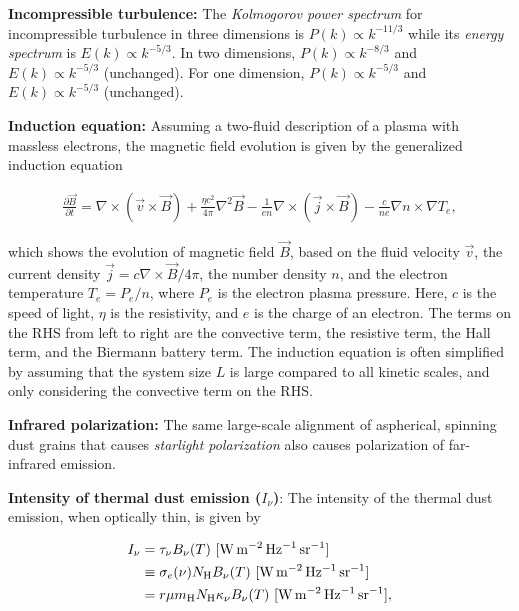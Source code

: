 \documentclass[a4paper,10pt]{article}
\begin{document}
{\noindent}\textbf{Incompressible turbulence:} The \textit{Kolmogorov power spectrum} for incompressible turbulence in three dimensions is $P(k)\propto k^{-11/3}$ while its \textit{energy spectrum} is $E(k)\propto k^{-5/3}$. In two dimensions, $P(k)\propto k^{-8/3}$ and $E(k)\propto k^{-5/3}$ (unchanged). For one dimension, $P(k)\propto k^{-5/3}$ and $E(k)\propto k^{-5/3}$ (unchanged).

{\noindent}\textbf{Induction equation:} Assuming a two-fluid description of a plasma with massless electrons, the magnetic field evolution is given by the generalized induction equation

\begin{align*}
    \frac{\partial\vec{B}}{\partial t} = \nabla\times(\vec{v}\times\vec{B}) + \frac{\eta c^2}{4\pi}\nabla^2\vec{B} - \frac{1}{en}\nabla\times(\vec{j}\times\vec{B}) - \frac{c}{ne}\nabla n\times\nabla T_e,
\end{align*}

{\noindent}which shows the evolution of magnetic field $\vec{B}$, based on the fluid velocity $\vec{v}$, the current density $\vec{j}=c\nabla\times\vec{B}/4\pi$, the number density $n$, and the electron temperature $T_e=P_e/n$, where $P_e$ is the electron plasma pressure. Here, $c$ is the speed of light, $\eta$ is the resistivity, and $e$ is the charge of an electron. The terms on the RHS from left to right are the convective term, the resistive term, the Hall term, and the Biermann battery term. The induction equation is often simplified by assuming that the system size $L$ is large compared to all kinetic scales, and only considering the convective term on the RHS. 

{\noindent}\textbf{Infrared polarization:} The same large-scale alignment of aspherical, spinning dust grains that causes \textit{starlight polarization} also causes polarization of far-infrared emission.

{\noindent}\textbf{Intensity of thermal dust emission ($I_\nu$)}: The intensity of the thermal dust emission, when optically thin, is given by

\begin{align*}
    I_\nu &= \tau_\nu B_\nu(T) ~ [{\rm W\,m^{-2}\,Hz^{-1}\,sr^{-1}}] \\
             &\equiv \sigma_e(\nu)N_{\rm H}B_\nu(T) ~ [{\rm W\,m^{-2}\,Hz^{-1}\,sr^{-1}}] \\
             &= r\mu m_{\rm H}N_{\rm H}\kappa_\nu B_\nu(T) ~ [{\rm W\,m^{-2}\,Hz^{-1}\,sr^{-1}}],
\end{align*}
\end{document}
